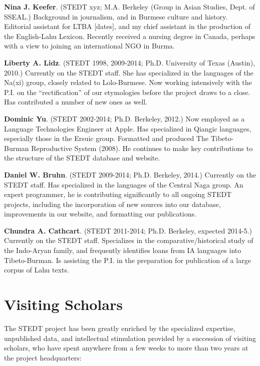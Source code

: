 \textbf{Nina J. Keefer}. (STEDT xyz; M.A. Berkeley (Group in Asian Studies, Dept. of SSEAL.) Background in journalism, and in Burmese culture and history. Editorial assistant for LTBA [dates], and my chief assistant in the production of the English-Lahu Lexicon. Recently received a nursing degree in Canada, perhaps with a view to joining an international NGO in Burma.

\textbf{Liberty A. Lidz}. (STEDT 1998, 2009-2014; Ph.D. University of Texas (Austin), 2010.) Currently on the STEDT staff. She has specialized in the languages of the Na(xi) group, closely related to Lolo-Burmese. Now working intensively with the P.I. on the “rectification” of our etymologies before the project draws to a close. Has contributed a number of new ones as well.

\textbf{Dominic Yu}. (STEDT 2002-2014; Ph.D. Berkeley, 2012.) Now employed as a Language Technologies Engineer at Apple. Has specialized in Qiangic languages, especially those in the Ersuic group. Formatted and produced The Tibeto-Burman Reproductive System (2008). He continues to make key contributions to the structure of the STEDT database and website.

\textbf{Daniel W. Bruhn}. (STEDT 2009-2014; Ph.D. Berkeley, 2014.) Currently on the STEDT staff. Has specialized in the languages of the Central Naga group. An expert programmer, he is contributing significantly to all ongoing STEDT projects, including the incorporation of new sources into our database, improvements in our website, and formatting our publications.

\textbf{Chundra A. Cathcart}. (STEDT 2011-2014; Ph.D. Berkeley, expected 2014-5.) Currently on the STEDT staff. Specializes in the comparative/historical study of the Indo-Aryan family, and frequently identifies loans from IA languages into Tibeto-Burman. Is assisting the P.I. in the preparation for publication of a large corpus of Lahu texts.

\section{Visiting Scholars}

The STEDT project has been greatly enriched by the specialized expertise, unpublished data, and intellectual stimulation provided by a succession of visiting scholars, who have spent anywhere from a few weeks to more than two years at the project headquarters: 

